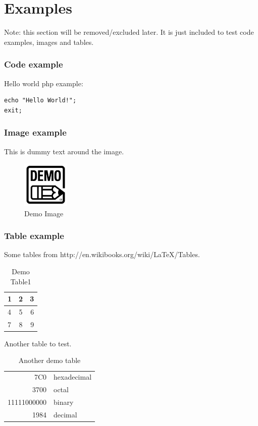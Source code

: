 \documentclass[main.tex]{subfiles}
\begin{document}
    \chapter{Examples}\label{chap:examples}
    Note: this section will be removed/excluded later. 
    It is just included to test code examples, images and tables.
    
    \subsection{Code example}
    Hello world php example:
    \begin{lstlisting}
echo "Hello World!";
exit;
\end{lstlisting}
    
    

    
    \subsection{Image example}
    
    This is dummy text around the image.
    \begin{figure}[H]
        \includegraphics[width=0.2\textwidth]{img/demo.jpg}
        \caption{Demo Image}
        \label{fig:demo_image}
    \end{figure}

    
    \subsection{Table example}
    Some tables from http://en.wikibooks.org/wiki/LaTeX/Tables.

\begin{table}[H]
    \begin{tabular}{ | l | c | r | }
        \hline
        1 & 2 & 3 \\
        \hline
        4 & 5 & 6 \\    
        \hline
        7 & 8 & 9 \\
        \hline
    \end{tabular}
  \caption{Demo Table1}
  \label{tab:demo_table1}
\end{table}

Another table to test.

\begin{table}[H]
    \begin{tabular}{|r|l|}
      \hline
      7C0 & hexadecimal \\
      3700 & octal \\ \cline{2-2}
      11111000000 & binary \\
      \hline \hline
      1984 & decimal \\
      \hline
    \end{tabular}
    \caption{Another demo table}
    \label{tab:demo_table2}
\end{table}
\end{document}

